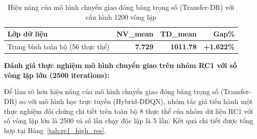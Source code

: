 \documentclass[13pt,a4paper]{extarticle}
\begin{document}
\begin{table}[!htbp]
\centering
\caption{Hiệu năng của mô hình chuyển giao đóng băng trọng số (Transfer-DR) với cấu hình 1200 vòng lặp}
\label{tab:transfer_dr}
\begin{tabular}{lrrr}
\toprule
\textbf{Lớp dữ liệu} & \textbf{NV\_mean} & \textbf{TD\_mean} & \textbf{Gap\%} \\
\midrule
Trung bình toàn bộ (56 thực thể) & \textbf{7.729} & \textbf{1011.78} & \textbf{+1.622\%} \\
\bottomrule
\end{tabular}
\end{table}

\textbf{Đánh giá thực nghiệm mô hình chuyển giao trên nhóm RC1 với số vòng lặp lớn (2500 iterations):}

Để làm rõ hơn hiệu năng của mô hình chuyển giao đóng băng trọng số (Transfer-DR) so với mô hình học trực tuyến (Hybrid-DDQN), nhóm tác giả tiến hành một thực nghiệm đối chứng chi tiết trên toàn bộ 8 thực thể của nhóm dữ liệu RC1 với số vòng lặp lớn là 2500 và số lần chạy độc lập là 5 lần. Kết quả chi tiết được tổng hợp tại Bảng~\ref{tab:rc1_high_res}.

\begin{table}[!htbp]
\centering
\caption{Kết quả đối chứng hiệu năng giữa Hybrid-DDQN và Hybrid-DDQN-Transfer-DR trên nhóm RC1 với 2500 vòng lặp (5 lượt chạy)}
\label{tab:rc1_high_res}
\end{table}
\end{document}
